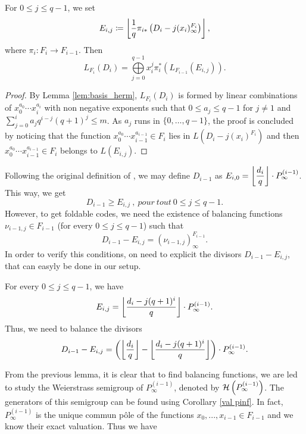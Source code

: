\documentclass[10pt]{article}
\begin{document}
\begin{proposition} 
	For $0 \leq j \leq q-1$, we set
	\[E_{i,j} \coloneqq \left\lfloor \frac{1}{q} \pi_{i*}\left(D_i-j(x_i)^{F_i}_{\infty}\right)\right\rfloor,\]
	where $\pi_i : F_i \rightarrow F_{i-1}$. Then 
\[L_{F_i}(D_i) = \bigoplus\limits_{j=0}^{q-1} x_i^j \pi_i^*\left(L_{F_{i-1}}(E_{i,j})\right).\]
\end{proposition}

\begin{proof}
	By Lemma \ref{lem:basis_herm}, $L_{F_i}(D_i)$ is formed by linear combinations of $x_0^{a_0} \cdots x_i^{a_i}$ with non negative exponents  such that $0 \leq a_j \leq q-1$ for $j\neq 1$ and $\sum\limits_{j=0}^i a_jq^{i-j}(q+1)^j \leq m$. As $a_j$ runs in $\{0,\dots,q-1\}$, the proof is concluded by noticing that the function $x_0^{a_0} \cdots x_{i-1}^{a_{i-1}} \in F_{i}$ lies in $L(D_i-j(x_i)^{F_i})$ and then $x_0^{a_0} \cdots x_{i-1}^{a_{i-1}} \in F_{i}$ belongs to $L(E_{i,j})$.
	
\end{proof}

Following the original definition of \cite{BN20}, we may define $D_{i-1}$ as $E_{i,0} = \left\lfloor \dfrac{d_i}{q} \right\rfloor \cdot P^{(i-1)}_{\infty}$. This way, we get 
\[D_{i-1} \geq E_{i,j} \ , \ pour \ tout \ 0 \leq j \leq q-1.\] 
However, to get foldable codes, we need the existence of balancing functions  $\nu_{i-1,j} \in F_{i-1}$ (for every  $0 \leq j \leq q-1$) such that 
\begin{equation}\label{eq:balancing_fct_herm}
	D_{i-1}-E_{i,j} = (\nu_{i-1,j})^{F_{i-1}}_{\infty}.
\end{equation}
In order to verify this conditions, on need to explicit the divisors $D_{i-1}-E_{i,j}$, that can easyly be done in our setup.

\begin{lemma} \label{divisor à équi}
For every $0 \leq j \leq q-1$, we have
\[E_{i,j} = \left\lfloor \dfrac{d_i-j(q+1)^i}{q}\right\rfloor \cdot P^{(i-1)}_{\infty}.\]
Thus, we need to balance the divisors
\[D_{i-1}-E_{i,j} = \left(\left\lfloor \dfrac{d_i}{q} \right\rfloor - \left\lfloor \dfrac{d_i-j(q+1)^i}{q}\right\rfloor\right) \cdot P^{(i-1)}_{\infty}.\]

\end{lemma}

From the previous lemma, it is clear that to find balancing functions, we are led to study the Weierstrass semigroup of $P^{(i-1)}_{\infty}$, denoted by $\mathcal{H}\left(P^{(i-1)}_{\infty}\right)$. The generators of this semigroup can be found using Corollary \ref{val pinf}. In fact, $P_{\infty}^{(i-1)}$ is the unique commun pôle of the functions $x_0,...,x_{i-1} \in 
F_{i-1}$ and we know their exact valuation. Thus we have
\end{document}
